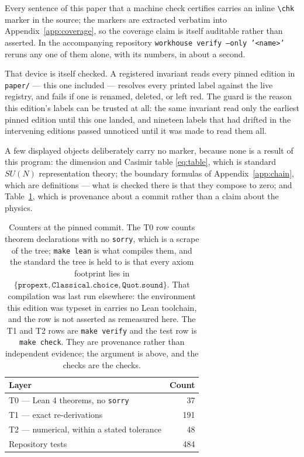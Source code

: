 \documentclass[11pt]{article}
\theoremstyle{plain}
\theoremstyle{definition}
\theoremstyle{remark}
\begin{document}
Every sentence of this paper that a machine check certifies carries an
inline \texttt{\textbackslash chk} marker in the source; the markers are
extracted verbatim into Appendix~\ref{app:coverage}, so the coverage claim
is itself auditable rather than asserted. In the accompanying repository
\texttt{workhouse verify --only '<name>'} reruns any one of them alone, with
its numbers, in about a second.

That device is itself checked. A registered invariant reads every pinned
edition in \texttt{paper/} --- this one included --- resolves every printed
label against the live registry, and fails if one is renamed, deleted, or left
red. The guard is the reason this edition's labels can be trusted at all: the
same invariant read only the earliest pinned edition until this one landed,
and nineteen labels that had drifted in the intervening editions passed
unnoticed until it was made to read them all.

A few displayed objects deliberately carry no marker, because none is a result
of this program: the dimension and Casimir table \eqref{eq:table}, which is
standard $SU(N)$ representation theory; the boundary formulas of
Appendix~\ref{app:chain}, which are definitions --- what is checked there is
that they compose to zero; and Table~\ref{tab:counters}, which is provenance
about a commit rather than a claim about the physics.

\begin{table}[ht]
\centering\small
\begin{tabular}{@{}lr@{}}
\toprule
Layer & Count \\
\midrule
T0 --- Lean 4 theorems, no \texttt{sorry} & 37 \\
T1 --- exact re-derivations & 191 \\
T2 --- numerical, within a stated tolerance & 48 \\
Repository tests & 484 \\
\bottomrule
\end{tabular}
\caption{Counters at the pinned commit. The T0 row counts theorem
declarations with no \texttt{sorry}, which is a scrape of the tree;
\texttt{make lean} is what compiles them, and the standard the tree is held to
is that every axiom footprint lies in
$\{\texttt{propext},\texttt{Classical.choice},\texttt{Quot.sound}\}$. That
compilation was last run elsewhere: the environment this edition was typeset
in carries no Lean toolchain, and the row is not asserted as remeasured here.
The T1 and T2 rows are \texttt{make verify} and the test row is
\texttt{make check}. They are provenance rather than independent evidence; the
argument is above, and the checks are the checks.}
\label{tab:counters}
\end{table}
\end{document}
